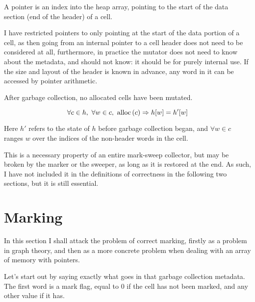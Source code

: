 \begin{definition}[Pointer]
  A pointer is an index into the heap array, pointing to the start of
  the data section (end of the header) of a cell.
\end{definition}

I have restricted \glspl{pointer} to only pointing at the start of the
data portion of a \gls{cell}, as then going from an internal
\gls{pointer} to a cell header does not need to be considered at all,
furthermore, in practice the \gls{mutator} does not need to know about
the metadata, and should not know: it should be for purely internal
use. If the size and layout of the header is known in advance, any
word in it can be accessed by \gls{pointer} arithmetic.

\begin{definition}
  After garbage collection, no allocated cells have been mutated.

   \[\forall c \in h,\ \forall w \in c,\ \alloc{c} \implies h[w] =
   h'[w]\]

   Here $h'$ refers to the state of $h$ before garbage collection
   began, and $\forall w \in c$ ranges $w$ over the indices of the
   non-header words in the cell.
\end{definition}

This is a necessary property of an entire mark-sweep collector, but
may be broken by the marker or the sweeper, as long as it is restored
at the end. As such, I have not included it in the definitions of
correctness in the following two sections, but it is still essential.

\section{Marking}

In this section I shall attack the problem of correct marking, firstly
as a problem in graph theory, and then as a more concrete problem when
dealing with an array of memory with pointers.

Let's start out by saying exactly what goes in that \gls{garbage
  collection} metadata. The first word is a mark flag, equal to 0 if
the \gls{cell} has not been marked, and any other value if it has.

